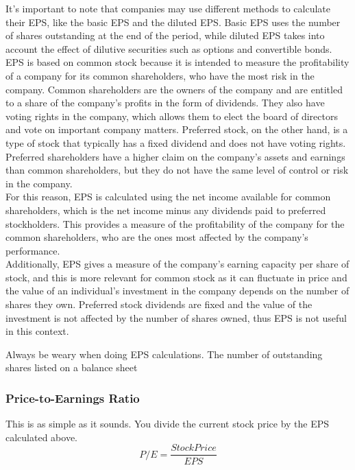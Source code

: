 \documentclass{article}
\begin{document}
It's important to note that companies may use different methods to calculate their EPS, like the basic EPS and the diluted EPS. Basic EPS uses the number of shares outstanding at the end of the period, while diluted EPS takes into account the effect of dilutive securities such as options and convertible bonds.\\

EPS is based on common stock because it is intended to measure the profitability of a company for its common shareholders, who have the most risk in the company. Common shareholders are the owners of the company and are entitled to a share of the company's profits in the form of dividends. They also have voting rights in the company, which allows them to elect the board of directors and vote on important company matters. Preferred stock, on the other hand, is a type of stock that typically has a fixed dividend and does not have voting rights. Preferred shareholders have a higher claim on the company's assets and earnings than common shareholders, but they do not have the same level of control or risk in the company.\\

For this reason, EPS is calculated using the net income available for common shareholders, which is the net income minus any dividends paid to preferred stockholders. This provides a measure of the profitability of the company for the common shareholders, who are the ones most affected by the company's performance.\\

Additionally, EPS gives a measure of the company's earning capacity per share of stock, and this is more relevant for common stock as it can fluctuate in price and the value of an individual's investment in the company depends on the number of shares they own. Preferred stock dividends are fixed and the value of the investment is not affected by the number of shares owned, thus EPS is not useful in this context.

Always be weary when doing EPS calculations. The number of outstanding shares listed on a balance sheet
\subsubsection{Price-to-Earnings Ratio}
This is as simple as it sounds. You divide the current stock price by the EPS calculated above.
\begin{equation}
    P/E = \frac{Stock Price}{EPS}
\end{equation}\\
\end{document}
